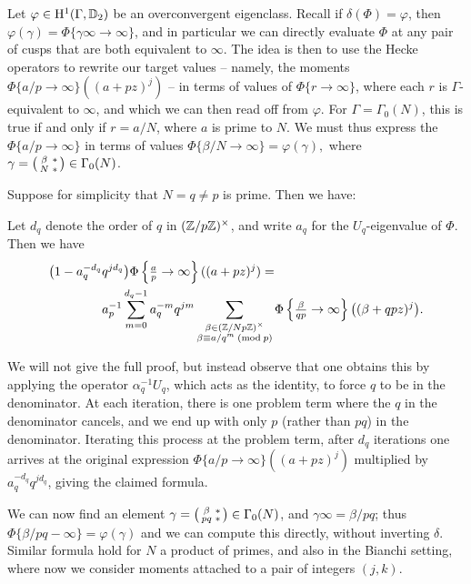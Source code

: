 \documentclass[a4paper,11pt]{article}
\numberwithin{equation}{section}
\begin{document}
Let $\varphi \in \mathrm{H}^1(\Gamma,\mathbb{D}_2)$ be an overconvergent eigenclass. Recall if $\delta(\Phi) = \varphi$, then $\varphi(\gamma) = \Phi\{\gamma\infty \to \infty\}$, and in particular we can directly evaluate $\Phi$ at any pair of cusps that are both equivalent to $\infty$. The idea is then to use the Hecke operators to rewrite our target values -- namely, the moments $\Phi\{a/p \to \infty\}((a+pz)^j)$ -- in terms of values of $\Phi\{r\to \infty\}$, where each $r$ is $\Gamma$-equivalent to $\infty$, and which we can then read off from $\varphi$. For $\Gamma = \Gamma_0(N)$, this is true if and only if $r = a/N$, where $a$ is prime to $N$. We must thus express the $\Phi\{a/p \to \infty\}$ in terms of values $\Phi\{\beta/N \to \infty\} = \varphi(\gamma),$ where $\gamma = \left(\begin{smallmatrix}\beta & *\\N & *\end{smallmatrix}\right) \in \Gamma_0(N)$.

Suppose for simplicity that $N = q \neq p$ is prime. Then we have:
\begin{proposition}
Let $d_q$ denote the order of $q$ in $(\mathbb{Z}/p\mathbb{Z})^\times$, and write $a_q$ for the $U_q$-eigenvalue of $\Phi$. Then we have
\begin{align*}
\big(1 -a_q^{-d_q}&q^{jd_q}\big)\Phi\left\{\tfrac{a}{p}\rightarrow\infty\right\}((a+pz)^j) =
\\
& a_p^{-1} \sum_{m = 0}^{d_q-1} a_q^{-m}q^{jm}%
\sum_{\substack{\beta \in (\Z/Np\Z)^\times\\ \beta \equiv a/q^m\newmod{p}}} \Phi\left\{\tfrac{\beta}{qp}\rightarrow \infty\right\}\big((\beta + qpz)^j\big).
\end{align*}
\end{proposition}
We will not give the full proof, but instead observe that one obtains this by applying the operator $\alpha_q^{-1}U_q$, which acts as the identity, to force $q$ to be in the denominator. At each iteration, there is one problem term where the $q$ in the denominator cancels, and we end up with only $p$ (rather than $pq$) in the denominator. Iterating this process at the problem term, after $d_q$ iterations one arrives at the original expression $\Phi\{a/p \to \infty\}((a+pz)^j)$ multiplied by $a_q^{-d_q}q^{jd_q}$, giving the claimed formula.

We can now find an element $\gamma = \left(\begin{smallmatrix}\beta & *\\pq & *\end{smallmatrix}\right) \in \Gamma_0(N)$, and $\gamma\infty = \beta/pq$; thus $\Phi\{\beta/pq - \infty\} = \varphi(\gamma)$ and we can compute this directly, without inverting $\delta$. Similar formula hold for $N$ a product of primes, and also in the Bianchi setting, where now we consider moments attached to a pair of integers $(j,k)$.
\end{document}
